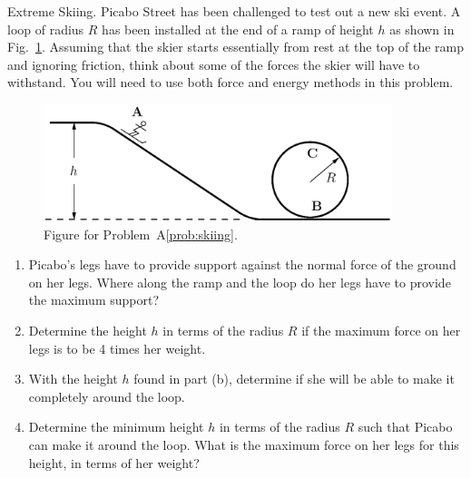\begin{aproblem}{Extreme Skiing.}
  Picabo Street has been challenged to test out a new ski event.  A
  loop of radius $R$ has been installed at the end of a ramp of height
  $h$ as shown in Fig.~\ref{fig:skiing}.  Assuming that the skier
  starts essentially from rest at the top of the ramp and ignoring
  friction, think about some of the forces the skier will have to
  withstand.  You will need to use both force and energy methods in
  this problem.
  \begin{figure}[h]
    \begin{center}
    \includegraphics[width=4in]{additional_problems/skiing.eps}
    \end{center}
    \caption{Figure for Problem~A\ref{prob:skiing}.}
    \label{fig:skiing}
  \end{figure}

  \begin{enumerate}
  \item Picabo's legs have to provide support against the normal force
    of the ground on her legs.  Where along the ramp and the loop do
    her legs have to provide the maximum support?

  \item Determine the height $h$ in terms of the radius $R$ if the
    maximum force on her legs is to be 4 times her weight.

  \item With the height $h$ found in part (b), determine if she will
    be able to make it completely around the loop.

  \item Determine the minimum height $h$ in terms of the radius $R$
    such that Picabo can make it around the loop.  What is the maximum
    force on her legs for this height, in terms of her weight?
  \end{enumerate}
  \label{prob:skiing}
\end{aproblem}



